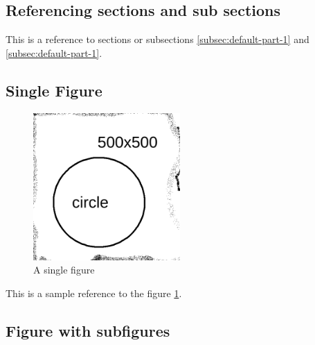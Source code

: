 \documentclass[
	11pt
] {article}
\begin{document}
	\subsection{Referencing sections and sub sections}
		This is a reference to sections or subsections \ref{subsec:default-part-1} and \ref{subsec:default-part-1}.

	\subsection{Single Figure}
		\begin{figure}[H]
			\centering
			\includegraphics[width=0.5\textwidth]{fig-default-02}
			\caption{A single figure}
			\label{fig:default-single-figure}
		\end{figure}

		This is a sample reference to the figure \ref{fig:default-single-figure}.

	\subsection{Figure with subfigures}
\end{document}
